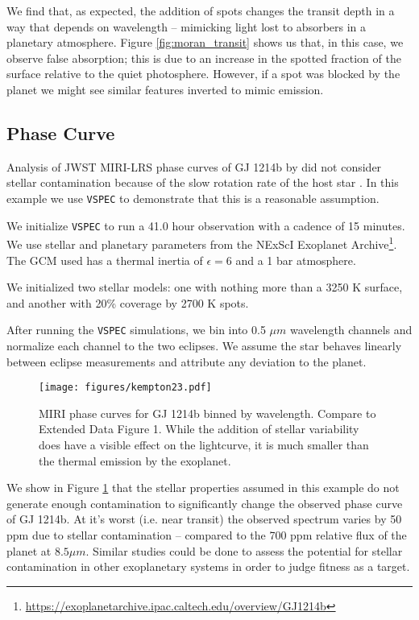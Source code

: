 \documentclass[twocolumn]{aastex631}
\newcommand{\vspec}[1]{\texttt{VSPEC}#1}
\begin{document}
We find that, as expected, the addition of spots changes the transit depth in a way that depends on wavelength -- mimicking
light lost to absorbers in a planetary atmosphere. Figure \ref{fig:moran_transit} shows us that, in this case, we observe false absorption;
this is due to an increase in the spotted fraction of the surface relative to the quiet photosphere. However, if a spot was blocked by
the planet we might see similar features inverted to mimic emission.

\subsection{Phase Curve}
Analysis of JWST MIRI-LRS phase curves of GJ 1214b by \citet{kempton2023} did not consider stellar
contamination because of the slow rotation rate of the host star \citep[approximately 1/80$^{\text{th}}$ the orbital frequency,][]{cloutier2021}.
In this example we use \vspec{} to demonstrate that this is a reasonable assumption.

We initialize \vspec{} to run a 41.0 hour observation with a cadence of 15 minutes. We use stellar and planetary parameters
from the NExScI Exoplanet Archive\footnote{\url{https://exoplanetarchive.ipac.caltech.edu/overview/GJ1214b}}.
The GCM used has a thermal inertia of $\epsilon = 6$ and a 1 bar  atmosphere.

We initialized two stellar models: one with nothing more than a 3250 K surface, and another with 20\% coverage by 2700 K spots.

After running the \vspec{} simulations, we bin into 0.5 $\mu m$ wavelength channels and normalize each channel to the two eclipses.
We assume the star behaves linearly between eclipse measurements and attribute any deviation to the planet.

\begin{figure}
    \centering
    \texttt{[image: figures/kempton23.pdf]}
    \caption{
        MIRI phase curves for GJ 1214b binned by wavelength. Compare to \citet{kempton2023} Extended Data Figure 1.
        While the addition of stellar variability does have a visible effect on the lightcurve, it is much smaller than the thermal emission by the exoplanet.
        }
    \label{fig:gj1214b}
\end{figure}

We show in Figure \ref{fig:gj1214b} that the stellar properties assumed in this example do not generate enough contamination to
significantly change the observed phase curve of GJ 1214b. At it's worst (i.e. near transit) the observed spectrum varies by 50 ppm due to stellar
contamination -- compared to the 700 ppm relative flux of the planet at $8.5 {\mu m}$. Similar studies could be done to assess the potential for
stellar contamination in other exoplanetary systems in order to judge fitness as a target.
\end{document}
